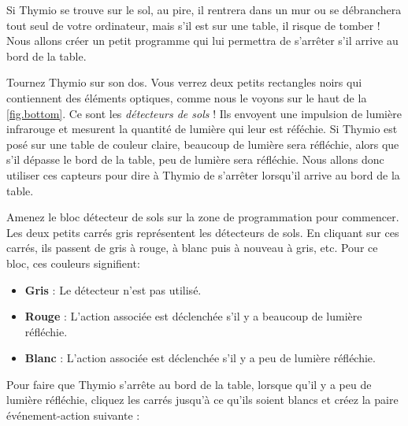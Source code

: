
Si Thymio se trouve sur le sol, au pire, il rentrera dans un mur ou se débranchera tout seul de votre ordinateur, mais s'il est sur une table, il risque de tomber !
Nous allons créer un petit programme qui lui permettra de s'arrêter s'il arrive au bord de la table.


Tournez Thymio sur son dos. Vous verrez deux petits rectangles noirs qui contiennent des éléments optiques, comme nous le voyons sur le haut de la \cref{fig.bottom}.
Ce sont les \emph{détecteurs de sols} !
Ils envoyent une impulsion de lumière infrarouge et mesurent la quantité de lumière qui leur est réféchie.
Si Thymio est posé sur une table de couleur claire, beaucoup de lumière sera réfléchie, alors que s'il dépasse le bord de la table, peu de lumière sera réfléchie.
Nous allons donc utiliser ces capteurs pour dire à Thymio de s'arrêter lorsqu'il arrive au bord de la table.


Amenez le bloc détecteur de sols  sur la zone de programmation pour commencer.
Les deux petits carrés gris représentent les détecteurs de sols.
En cliquant sur ces carrés, ils passent de gris à rouge, à blanc puis à nouveau à gris, etc. Pour ce bloc, ces couleurs signifient:

\begin{itemize}
\item \textbf{Gris} : Le détecteur n'est pas utilisé.
\item \textbf{Rouge} : L'action associée est déclenchée s'il y a beaucoup de lumière réfléchie.
\item \textbf{Blanc} : L'action associée est déclenchée s'il y a peu de lumière réfléchie.
\end{itemize}


Pour faire que Thymio s'arrête au bord de la table, lorsque qu'il y a peu de lumière réfléchie, cliquez les carrés jusqu'à ce qu'ils soient blancs et créez la paire événement-action suivante : 


